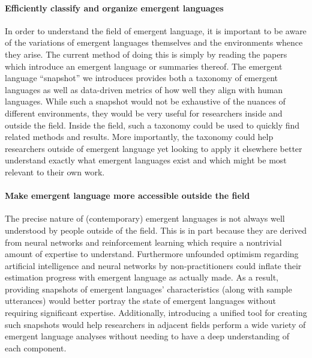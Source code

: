 
\paragraph{Efficiently classify and organize emergent languages}
In order to understand the field of emergent language, it is important to be aware of the variations of emergent languages themselves and the environments whence they arise.
The current method of doing this is simply by reading the papers which introduce an emergent language or summaries thereof.
The emergent language ``snapshot'' we introduces provides both a taxonomy of emergent languages as well as data-driven metrics of how well they align with human languages.
While such a snapshot would not be exhaustive of the nuances of different environments, they would be very useful for researchers inside and outside the field.
Inside the field, such a taxonomy could be used to quickly find related methods and results.
More importantly, the taxonomy could help researchers outside of emergent language yet looking to apply it elsewhere better understand exactly what emergent languages exist and which might be most relevant to their own work.

\paragraph{Make emergent language more accessible outside the field}
The precise nature of (contemporary) emergent languages is not always well understood by people outside of the field.
This is in part because they are derived from neural networks and reinforcement learning which require a nontrivial amount of expertise to understand.
Furthermore unfounded optimism regarding artificial intelligence and neural networks by non-practitioners could inflate their estimation progress with emergent language as actually made.
As a result, providing snapshots of emergent languages' characteristics (along with sample utterances) would better portray the state of emergent languages without requiring significant expertise.
Additionally, introducing a unified tool for creating such snapshots would help researchers in adjacent fields perform a wide variety of emergent language analyses without needing to have a deep understanding of each component.

